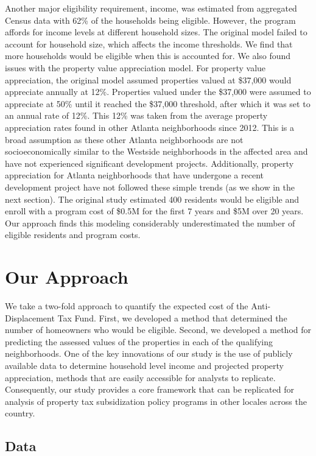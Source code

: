 \documentclass{acm_proc_article-sp}
\begin{document}
Another major eligibility requirement, income, was estimated from aggregated Census data with 62\% of the households being eligible. However, the program affords for income levels at different household sizes. The original model failed to account for household size, which affects the income thresholds. We find that more households would be eligible when this is accounted for. We also found issues with the property value appreciation model. For property value appreciation, the original model assumed properties valued at \$37,000 would appreciate annually at 12\%. Properties valued under the \$37,000 were assumed to appreciate at 50\% until it reached the \$37,000 threshold, after which it was set to an annual rate of 12\%. This 12\% was taken from the average property appreciation rates found in other Atlanta neighborhoods since 2012. This is a broad assumption as these other Atlanta neighborhoods are not socioeconomically similar to the Westside neighborhoods in the affected area and have not experienced significant development projects. Additionally, property appreciation for Atlanta neighborhoods that have undergone a recent development project have not followed these simple trends (as we show in the next section). The original study estimated 400 residents would be eligible and enroll with a program cost of \$0.5M for the first 7 years and \$5M over 20 years. Our approach finds this modeling considerably underestimated the number of eligible residents and program costs.

\section{Our Approach}

We take a two-fold approach to quantify the expected cost of the Anti-Displacement Tax Fund. First, we developed a method that determined the number of homeowners who would be eligible. Second, we developed a method for predicting the assessed values of the properties in each of the qualifying neighborhoods. One of the key innovations of our study is the use of publicly available data to determine household level income and projected property appreciation, methods that are easily accessible for analysts to replicate. Consequently, our study provides a core framework that can be replicated for analysis of property tax subsidization policy programs in other locales across the country.

\subsection{Data}
\end{document}
